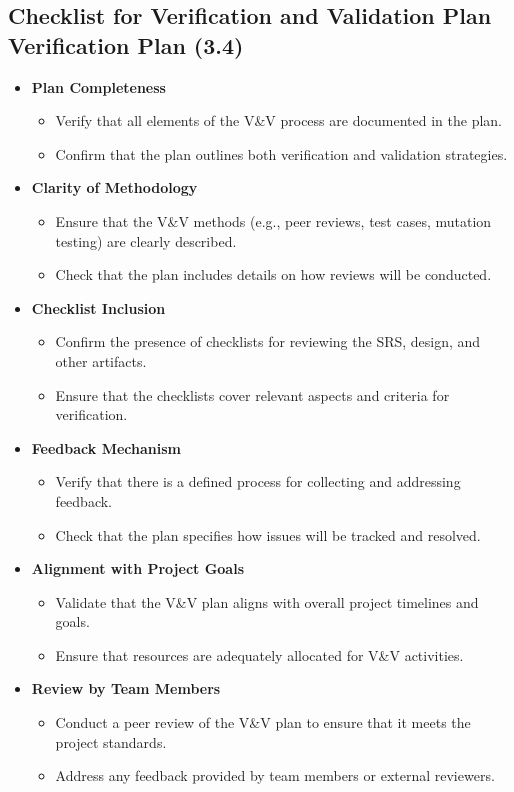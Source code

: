 \documentclass[12pt, titlepage]{article}
\begin{document}
\subsection*{Checklist for Verification and Validation Plan Verification Plan (3.4)}
\begin{itemize}
    \item \textbf{Plan Completeness}
    \begin{itemize}
        \item Verify that all elements of the V\&V process are documented in the plan.
        \item Confirm that the plan outlines both verification and validation strategies.
    \end{itemize}
    \item \textbf{Clarity of Methodology}
    \begin{itemize}
        \item Ensure that the V\&V methods (e.g., peer reviews, test cases, mutation testing) are clearly described.
        \item Check that the plan includes details on how reviews will be conducted.
    \end{itemize}
    \item \textbf{Checklist Inclusion}
    \begin{itemize}
        \item Confirm the presence of checklists for reviewing the SRS, design, and other artifacts.
        \item Ensure that the checklists cover relevant aspects and criteria for verification.
    \end{itemize}
    \item \textbf{Feedback Mechanism}
    \begin{itemize}
        \item Verify that there is a defined process for collecting and addressing feedback.
        \item Check that the plan specifies how issues will be tracked and resolved.
    \end{itemize}
    \item \textbf{Alignment with Project Goals}
    \begin{itemize}
        \item Validate that the V\&V plan aligns with overall project timelines and goals.
        \item Ensure that resources are adequately allocated for V\&V activities.
    \end{itemize}
    \item \textbf{Review by Team Members}
    \begin{itemize}
        \item Conduct a peer review of the V\&V plan to ensure that it meets the project standards.
        \item Address any feedback provided by team members or external reviewers.
    \end{itemize}
\end{itemize}
\end{document}
